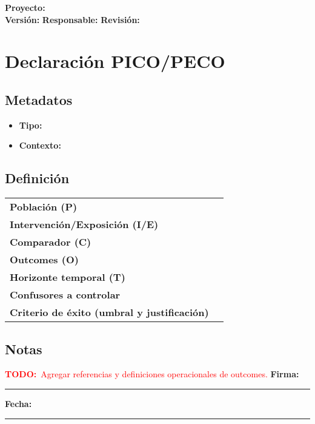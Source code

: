 \documentclass[11pt]{article}
\newcommand{\project}{\textbf{Proyecto:} \underline{\hspace{7cm}}}
\newcommand{\version}{\textbf{Versi\'on:} \underline{\hspace{3cm}}}
\newcommand{\owner}{\textbf{Responsable:} \underline{\hspace{5cm}}}
\newcommand{\review}{\textbf{Revisi\'on:} \underline{\hspace{3cm}}}
\newcommand{\signatureline}{\vspace{0.5cm}\noindent\textbf{Firma:}\ \rule{6cm}{0.4pt} \hfill \textbf{Fecha:}\ \rule{3cm}{0.4pt}}
\newcommand{\todo}[1]{\textcolor{red}{\textbf{TODO:}~#1}}
\begin{document}
\begin{flushright}
\project \\ \version \hspace{1cm} \owner \hspace{1cm} \review
\end{flushright}


\section*{Declaraci\'on PICO/PECO}
\subsection*{Metadatos}
\begin{itemize}
  \item \textbf{Tipo:}  \hspace{0.5cm} 
  \item \textbf{Contexto:} \underline{\hspace{10cm}}
\end{itemize}

\subsection*{Definici\'on}
\begin{tabularx}{\linewidth}{@{}>{\bfseries}lX@{}}
Poblaci\'on (P) & \\
Intervenci\'on/Exposici\'on (I/E) & \\
Comparador (C) & \\
Outcomes (O) & \\
Horizonte temporal (T) & \\
Confusores a controlar & \\
Criterio de \'exito (umbral y justificaci\'on) & \\
\end{tabularx}

\subsection*{Notas}
\todo{Agregar referencias y definiciones operacionales de outcomes.}
\signatureline

\label{LastPage}
\end{document}
